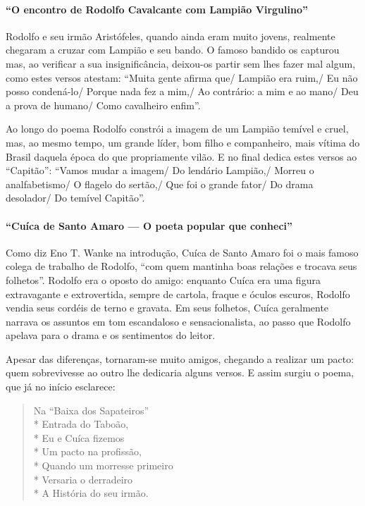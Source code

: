 \paragraph{“O encontro de Rodolfo Cavalcante com Lampião Virgulino”}

Rodolfo e seu irmão Aristófeles, quando ainda eram muito jovens,
realmente chegaram a cruzar com Lampião e seu bando. O famoso bandido
os capturou mas, ao verificar a sua insignificância, deixou-os partir
sem lhes fazer mal algum, como estes versos atestam: “Muita gente
afirma que/ Lampião era ruim,/ Eu não posso condená-lo/ Porque nada fez
a mim,/ Ao contrário: a mim e ao mano/ Deu a prova de humano/ Como
cavalheiro enfim”.

Ao longo do poema Rodolfo constrói a imagem de um Lampião temível e
cruel, mas, ao mesmo tempo, um grande líder, bom filho e companheiro,
mais vítima do Brasil daquela época do que propriamente vilão. E no
final dedica estes versos ao “Capitão”: “Vamos mudar a imagem/ Do
lendário Lampião,/ Morreu o analfabetismo/ O flagelo do sertão,/ Que
foi o grande fator/ Do drama desolador/ Do temível Capitão”.

\paragraph{“Cuíca de Santo Amaro — O poeta popular que conheci”}

Como diz Eno T. Wanke na introdução, Cuíca de Santo Amaro foi o mais
famoso colega de trabalho de Rodolfo, “com quem mantinha boas relações
e trocava seus folhetos”. Rodolfo era o oposto do amigo: enquanto Cuíca
era uma figura extravagante e extrovertida, sempre de cartola, fraque e
óculos escuros, Rodolfo vendia seus cordéis de terno e gravata. Em seus
folhetos, Cuíca geralmente narrava os assuntos em tom escandaloso e
sensacionalista, ao passo que Rodolfo apelava para o drama e os
sentimentos do leitor.

Apesar das diferenças, tornaram-se muito amigos, chegando a realizar um
pacto: quem sobrevivesse ao outro lhe dedicaria alguns versos. E assim
surgiu o poema, que já no início esclarece:


\begin{verse}

Na “Baixa dos Sapateiros”\\*
Entrada do Taboão,\\*
Eu e Cuíca fizemos\\*
Um pacto na profissão,\\*
Quando um morresse primeiro\\*
Versaria o derradeiro\\*
A História do seu irmão.

\end{verse}

